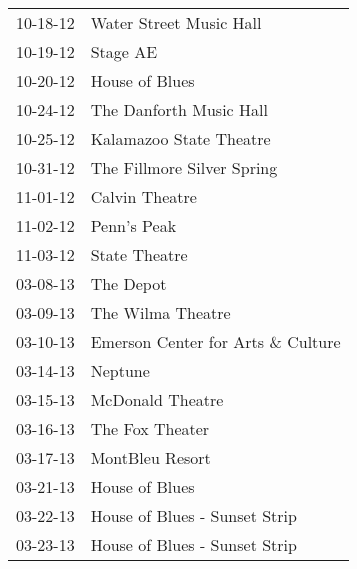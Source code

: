 \begin{supertabular}{p{0.25\columnwidth}p{0.75\columnwidth}}
 10-18-12 &            Water Street Music Hall \\
 10-19-12 &                           Stage AE \\
 10-20-12 &                     House of Blues \\
 10-24-12 &            The Danforth Music Hall \\
 10-25-12 &            Kalamazoo State Theatre \\
 10-31-12 &         The Fillmore Silver Spring \\
 11-01-12 &                     Calvin Theatre \\
 11-02-12 &                        Penn's Peak \\
 11-03-12 &                      State Theatre \\
 03-08-13 &                          The Depot \\
 03-09-13 &                  The Wilma Theatre \\
 03-10-13 &  Emerson Center for Arts \& Culture \\
 03-14-13 &                            Neptune \\
 03-15-13 &                   McDonald Theatre \\
 03-16-13 &                    The Fox Theater \\
 03-17-13 &                    MontBleu Resort \\
 03-21-13 &                     House of Blues \\
 03-22-13 &      House of Blues - Sunset Strip \\
 03-23-13 &      House of Blues - Sunset Strip \\
\end{supertabular}
